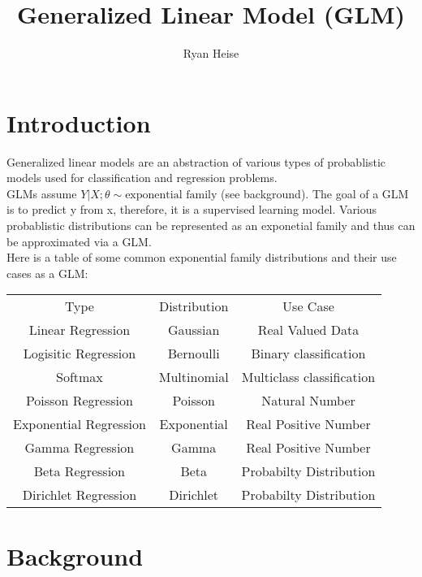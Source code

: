 \documentclass{article}
\author{Ryan Heise}
\title{Generalized Linear Model (GLM)}
\begin{document}
\maketitle

\section{Introduction}

Generalized linear models are an abstraction of various types of probablistic models used for classification and regression problems. \\
GLMs assume $Y|X;\theta \sim \text{exponential family}$ (see background). The goal of a GLM is to predict y from x, therefore, it is a supervised learning model. 
Various probablistic distributions can be represented as an exponetial family and thus can be approximated via a GLM. \\
Here is a table of some common exponential family distributions and their use cases as a GLM:\\
\begin{center}
    \begin{tabular}{ c c c }
     Type & Distribution & Use Case \\ 
     Linear Regression & Gaussian & Real Valued Data \\  
     Logisitic Regression & Bernoulli & Binary classification\\
     Softmax & Multinomial & Multiclass classification\\
     Poisson Regression & Poisson & Natural Number\\
     Exponential Regression & Exponential & Real Positive Number\\
     Gamma Regression & Gamma & Real Positive Number\\
     Beta Regression & Beta & Probabilty Distribution\\
     Dirichlet Regression & Dirichlet & Probabilty Distribution\\
    \end{tabular}
\end{center}
\section{Background}
\end{document}
